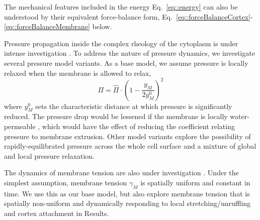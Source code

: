 The mechanical features included in the energy Eq.~\ref{eq::energy} can also be understood by their equivalent force-balance form, Eq.~\ref{eq::forceBalanceCortex}-\ref{eq::forceBalanceMembrane} below.




Pressure propagation inside the complex rheology of the cytoplasm is under intense investigation \cite{Charras:2005dm, Strychalski:2013eo, Sedzinski:2011ef}. To address the nature of pressure dynamics, we investigate several pressure model variants. As a base model, we assume pressure is locally relaxed when the membrane is allowed to relax, 
\begin{equation}
\Pi = \hat{\Pi}\cdot \left(1 - \frac{y_M}{2 y_M^0} \right)^2 \label{eq::localPressure}
\end{equation}
where $y_M^0$ sets the characteristic distance at which pressure is significantly reduced. The pressure drop would be lessened if the membrane is locally water-permeable \cite{Taloni:2015}, which would have the effect of reducing the coefficient relating pressure to membrane extrusion. Other model variants explore the possibility of rapidly-equilibrated pressure across the whole cell surface and a mixture of global and local pressure relaxation.  

The dynamics of membrane tension are also under investigation \cite{BenFogelson:2014gx,Peukes:2014fw,Tinevez:2009bh,Weiner:2007gd,Allard:2012if}. Under the simplest assumption, membrane tension $\gamma_M$ is spatially uniform and constant in time. We use this as our base model, but also explore membrane tension that is spatially non-uniform and dynamically responding to local stretching/unruffling and cortex attachment in Results. 

